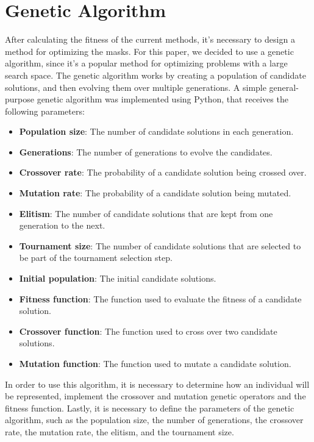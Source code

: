 \documentclass[sigconf,authordraft]{acmart}
\begin{document}
\section{Genetic Algorithm}

After calculating the fitness of the current methods, it's necessary to design a method for optimizing the masks.
For this paper, we decided to use a genetic algorithm, since it's a popular method for optimizing problems with a large search space.
The genetic algorithm works by creating a population of candidate solutions, and then evolving them over multiple generations.
A simple general-purpose genetic algorithm was implemented using Python, that receives the following parameters:

\begin{itemize}
  \item \textbf{Population size}: The number of candidate solutions in each generation.
  \item \textbf{Generations}: The number of generations to evolve the candidates.
  \item \textbf{Crossover rate}: The probability of a candidate solution being crossed over.
  \item \textbf{Mutation rate}: The probability of a candidate solution being mutated.
  \item \textbf{Elitism}: The number of candidate solutions that are kept from one generation to the next.
  \item \textbf{Tournament size}: The number of candidate solutions that are selected to be part of the tournament selection step.
  \item \textbf{Initial population}: The initial candidate solutions.
  \item \textbf{Fitness function}: The function used to evaluate the fitness of a candidate solution.
  \item \textbf{Crossover function}: The function used to cross over two candidate solutions.
  \item \textbf{Mutation function}: The function used to mutate a candidate solution.
\end{itemize}

In order to use this algorithm, it is necessary to determine how an individual will be represented, implement the crossover and mutation genetic operators and the fitness function.
Lastly, it is necessary to define the parameters of the genetic algorithm, such as the population size, the number of generations, the crossover rate, the mutation rate, the elitism, and the tournament size.
\end{document}
